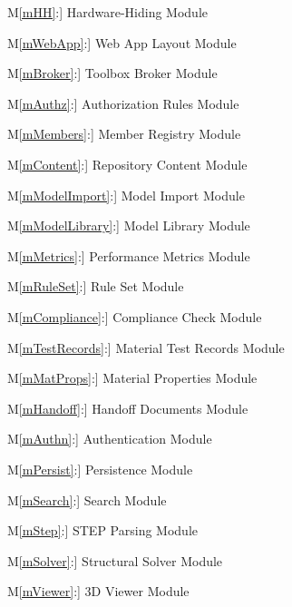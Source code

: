 \documentclass[12pt, titlepage]{article}
\newcounter{mnum}
\newcommand{\mref}[1]{\hyperref[#1:dec]{M\ref*{#1}}}
\begin{document}
\begin{description}
\item [\label{mHH}\mref{mHH}:] Hardware-Hiding Module
\item [\label{mWebApp}\mref{mWebApp}:] Web App Layout Module
\item [\label{mBroker}\mref{mBroker}:] Toolbox Broker Module
\item [\label{mAuthz}\mref{mAuthz}:] Authorization Rules Module
\item [\label{mMembers}\mref{mMembers}:] Member Registry Module
\item [\label{mContent}\mref{mContent}:] Repository Content Module
\item [\label{mModelImport}\mref{mModelImport}:] Model Import Module
\item [\label{mModelLibrary}\mref{mModelLibrary}:] Model Library Module
\item [\label{mMetrics}\mref{mMetrics}:] Performance Metrics Module
\item [\label{mRuleSet}\mref{mRuleSet}:] Rule Set Module
\item [\label{mCompliance}\mref{mCompliance}:] Compliance Check Module
\item [\label{mTestRecords}\mref{mTestRecords}:] Material Test Records Module
\item [\label{mMatProps}\mref{mMatProps}:] Material Properties Module
\item [\label{mHandoff}\mref{mHandoff}:] Handoff Documents Module
\item [\label{mAuthn}\mref{mAuthn}:] Authentication Module
\item [\label{mPersist}\mref{mPersist}:] Persistence Module
\item [\label{mSearch}\mref{mSearch}:] Search Module
\item [\label{mStep}\mref{mStep}:] STEP Parsing Module
\item [\label{mSolver}\mref{mSolver}:] Structural Solver Module
\item [\label{mViewer}\mref{mViewer}:] 3D Viewer Module
\end{description}
\end{document}
